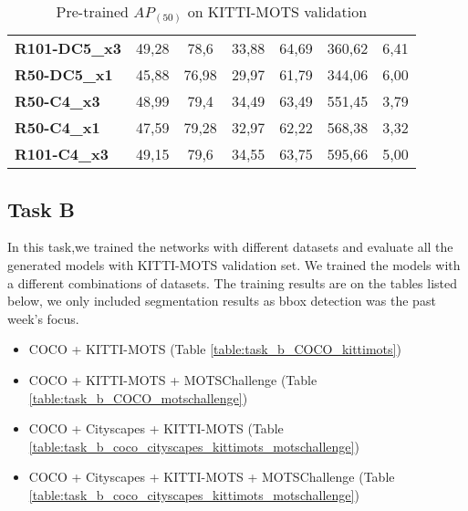 \documentclass[12pt,a4paper,twocolumn,twoside]{article}
\begin{document}
\begin{table*}[ht]
\begin{tabularx}{\textwidth}{lcccccc}
\multicolumn{1}{|l|}{\textbf{R101-DC5\_x3}} & \multicolumn{1}{c|}{49,28}      & \multicolumn{1}{c|}{78,6}         & \multicolumn{1}{c|}{33,88}             & 64,69                               & 360,62                                    & 6,41                                       \\ \cline{1-7}
\multicolumn{1}{|l|}{\textbf{R50-DC5\_x1}}  & \multicolumn{1}{c|}{45,88}      & \multicolumn{1}{c|}{76,98}        & \multicolumn{1}{c|}{29,97}             & 61,79                               & 344,06                                    & 6,00                                       \\ \cline{1-7}
\multicolumn{1}{|l|}{\textbf{R50-C4\_x3}}   & \multicolumn{1}{c|}{48,99}      & \multicolumn{1}{c|}{79,4}         & \multicolumn{1}{c|}{34,49}             & 63,49                               & 551,45                                    & 3,79                                       \\ \cline{1-7}
\multicolumn{1}{|l|}{\textbf{R50-C4\_x1}}   & \multicolumn{1}{c|}{47,59}      & \multicolumn{1}{c|}{79,28}        & \multicolumn{1}{c|}{32,97}             & 62,22                               & 568,38                                    & 3,32                                       \\
\textbf{R101-C4\_x3}                        & 49,15                           & 79,6                              & 34,55                                  & 63,75                               & 595,66                                    & 5,00                                       \\ \hline
\end{tabularx}
\caption{Pre-trained $AP_{(50)}$ on KITTI-MOTS validation}
\label{table:week4_taskA_COCO}
\end{table*}

\subsection{Task B}
In this task,we trained the networks with different datasets and evaluate all the generated models with KITTI-MOTS validation set. We trained the models with a different combinations of datasets. The training results are on the tables listed below, we only included segmentation results as bbox detection was the past week's focus.
\begin{itemize}
    \item COCO + KITTI-MOTS (Table \ref{table:task_b_COCO_kittimots})
    \item COCO + KITTI-MOTS + MOTSChallenge (Table \ref{table:task_b_COCO_motschallenge})
    \item COCO + Cityscapes + KITTI-MOTS (Table \ref{table:task_b_coco_cityscapes_kittimots_motschallenge})
    \item COCO + Cityscapes + KITTI-MOTS + MOTSChallenge (Table \ref{table:task_b_coco_cityscapes_kittimots_motschallenge})
\end{itemize}
\end{document}
